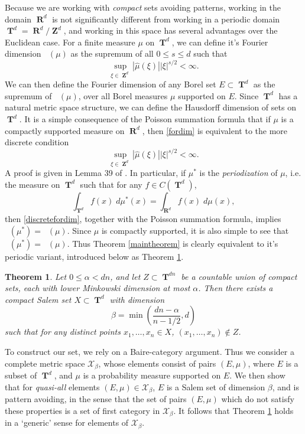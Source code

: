 \documentclass[12pt,reqno]{article}
\numberwithin{equation}{section}
\DeclareMathOperator{\hausdim}{\dim_{\mathbf{H}}}
\DeclareMathOperator{\fordim}{\dim_{\mathbf{F}}}
\DeclareMathOperator{\RR}{\mathbf{R}}
\DeclareMathOperator{\ZZ}{\mathbf{Z}}
\DeclareMathOperator{\TT}{\mathbf{T}}
\newtheorem{theorem}{Theorem}
\begin{document}
Because we are working with \emph{compact} sets avoiding patterns, working in the domain $\RR^d$ is not significantly different from working in a periodic domain $\TT^d = \RR^d / \ZZ^d$, and working in this space has several advantages over the Euclidean case. For a finite measure $\mu$ on $\TT^d$, we can define it's Fourier dimension $\fordim(\mu)$ as the supremum of all $0 \leq s \leq d$ such that
%
\begin{equation} \label{fordimtorus}
    \sup_{\xi \in \ZZ^d} |\widehat{\mu}(\xi)| |\xi|^{s/2} < \infty.
\end{equation}
%
We can then define the Fourier dimension of any Borel set $E \subset \TT^d$ as the supremum of $\fordim(\mu)$, over all Borel measures $\mu$ supported on $E$. Since $\TT^d$ has a natural metric space structure, we can define the Hausdorff dimension of sets on $\TT^d$. It is a simple consequence of the Poisson summation formula that if $\mu$ is a compactly supported measure on $\RR^d$, then \eqref{fordim} is equivalent to the more discrete condition
%
\begin{equation} \label{discretefordim}
    \sup_{\xi \in \ZZ^d} |\widehat{\mu}(\xi)| |\xi|^{s/2} < \infty.
\end{equation}
%
A proof is given in Lemma 39 of \cite{myThesis}. In particular, if $\mu^*$ is the \emph{periodization} of $\mu$, i.e. the measure on $\TT^d$ such that for any $f \in C(\TT^d)$,
%
\begin{equation}
    \int_{\TT^d} f(x)\; d\mu^*(x) = \int_{\RR^d} f(x)\; d\mu(x),
\end{equation}
%
then \eqref{discretefordim}, together with the Poisson summation formula, implies $\fordim(\mu^*) = \fordim(\mu)$. Since $\mu$ is compactly supported, it is also simple to see that $\hausdim(\mu^*) = \hausdim(\mu)$. Thus Theorem \ref{maintheorem} is clearly equivalent to it's periodic variant, introduced below as Theorem \ref{periodictheorem}.

\begin{theorem} \label{periodictheorem}
    Let $0 \leq \alpha < dn$, and let $Z \subset \TT^{dn}$ be a countable union of compact sets, each with lower Minkowski dimension at most $\alpha$. Then there exists a compact Salem set $X \subset \TT^d$ with dimension
    \[ \beta = \min \left( \frac{dn - \alpha}{n-1/2}, d \right) \]
    such that for any distinct points $x_1, \dots, x_n \in X$, $(x_1, \dots, x_n) \not \in Z$.
\end{theorem}

To construct our set, we rely on a Baire-category argument. Thus we consider a complete metric space $\mathcal{X}_\beta$, whose elements consist of pairs $(E,\mu)$, where $E$ is a subset of $\TT^d$, and $\mu$ is a probability measure supported on $E$. We then show that for \emph{quasi-all} elements $(E,\mu) \in \mathcal{X}_\beta$, $E$ is a Salem set of dimension $\beta$, and is pattern avoiding, in the sense that the set of pairs $(E,\mu)$ which do not satisfy these properties is a set of first category in $\mathcal{X}_\beta$. It follows that Theorem \ref{periodictheorem} holds in a `generic' sense for elements of $\mathcal{X}_\beta$.
\end{document}
